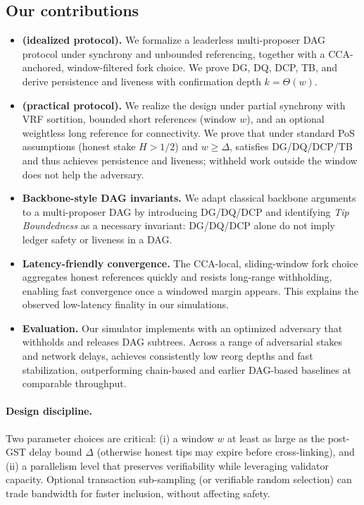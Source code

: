 \subsection{Our contributions}
\begin{itemize}
	\item \textbf{\ProjIdeal (idealized protocol).} We formalize a leaderless multi-proposer DAG protocol under synchrony and unbounded referencing, together with a CCA-anchored, window-filtered fork choice. We prove DG, DQ, DCP, TB, and derive persistence and liveness with confirmation depth $k = \Theta(w)$.
	\item \textbf{\ProjBase (practical protocol).} We realize the design under partial synchrony with VRF sortition, bounded short references (window $w$), and an optional weightless long reference for connectivity. We prove that under standard PoS assumptions (honest stake $H>1/2$) and $w \ge \Delta$, \ProjBase satisfies DG/DQ/DCP/TB and thus achieves persistence and liveness; withheld work outside the window does not help the adversary.
	\item \textbf{Backbone-style DAG invariants.} We adapt classical backbone arguments to a multi-proposer DAG by introducing DG/DQ/DCP and identifying \emph{Tip Boundedness} as a necessary invariant: DG/DQ/DCP alone do not imply ledger safety or liveness in a DAG.
	\item \textbf{Latency-friendly convergence.} The CCA-local, sliding-window fork choice aggregates honest references quickly and resists long-range withholding, enabling fast convergence once a windowed margin appears. This explains the observed low-latency finality in our simulations.
	\item \textbf{Evaluation.} Our simulator implements \ProjBase with an optimized adversary that withholds and releases DAG subtrees. Across a range of adversarial stakes and network delays, \Proj achieves consistently low reorg depths and fast stabilization, outperforming chain-based and earlier DAG-based baselines at comparable throughput.
\end{itemize}

\paragraph{Design discipline.}
Two parameter choices are critical: (i) a window $w$ at least as large as the post-GST delay bound $\Delta$ (otherwise honest tips may expire before cross-linking), and (ii) a parallelism level that preserves verifiability while leveraging validator capacity. Optional transaction sub-sampling (or verifiable random selection) can trade bandwidth for faster inclusion, without affecting safety.

